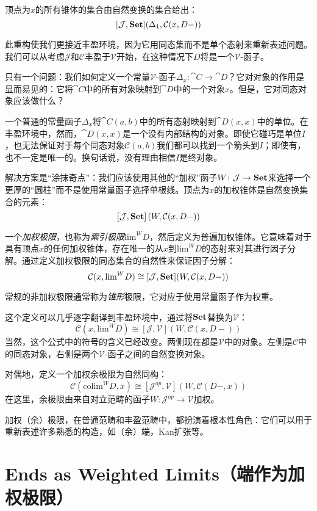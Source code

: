 \documentclass[DaoFP]{subfiles}
\begin{document}
 顶点为$x$的所有锥体的集合由自然变换的集合给出：
 \[ [\mathcal J, \mathbf{Set}] (\Delta_1, \mathcal C(x, D-)) \]

 此重构使我们更接近丰盈环境，因为它用同态集而不是单个态射来重新表述问题。我们可以从考虑$\mathcal J$和$\mathcal C$丰盈于$\mathcal V$开始，在这种情况下$D$将是一个$\mathcal V$-函子。

 只有一个问题：我们如何定义一个常量$\mathcal V$-函子$\Delta_x \colon \cat C \to \cat D$？它对对象的作用是显而易见的：它将$\cat C$中的所有对象映射到$\cat D$中的一个对象$x$。但是，它对同态对象应该做什么？

 一个普通的常量函子$\Delta_x$将$\cat C(a, b)$中的所有态射映射到$\cat D(x, x)$中的单位。在丰盈环境中，然而，$\cat D(x, x)$是一个没有内部结构的对象。即使它碰巧是单位$I$，也无法保证对于每个同态对象$\mathcal C(a, b)$我们都可以找到一个箭头到$I$；即使有，也不一定是唯一的。换句话说，没有理由相信$I$是终对象。

 解决方案是“涂抹奇点”：我们应该使用其他的“加权”函子$W \colon \mathcal J\to \mathbf{Set}$来选择一个更厚的“圆柱”而不是使用常量函子选择单根线。顶点为$x$的加权锥体是自然变换集合的元素：
 \[ [\mathcal J, \mathbf{Set}] \left(W, \mathcal C(x, D-)\right) \]

 一个\emph{加权极限}，也称为\emph{索引极限}$\text{lim}^W D$，然后定义为普遍加权锥体。它意味着对于具有顶点$x$的任何加权锥体，存在唯一的从$x$到$\text{lim}^W D$的态射来对其进行因子分解。通过定义加权极限的同态集合的自然性来保证因子分解：
 \[  \mathcal C(x, \text{lim}^W D) \cong [\mathcal J, \mathbf{Set}] (W, \mathcal C(x, D-)) \]

 常规的非加权极限通常称为\emph{锥形}极限，它对应于使用常量函子作为权重。

 这个定义可以几乎逐字翻译到丰盈环境中，通过将$\mathbf{Set}$替换为$\mathcal V$：
 \[  \mathcal C(x, \text{lim}^W D) \cong [\mathcal J, \mathcal V] (W, \mathcal C(x, D-)) \]
 当然，这个公式中的符号的含义已经改变。两侧现在都是$\mathcal V$中的对象。左侧是$\mathcal C$中的同态对象，右侧是两个$\mathcal V$-函子之间的自然变换对象。

 对偶地，定义一个加权余极限为自然同构：
 \[  \mathcal C(\text{colim}^W D, x) \cong [\mathcal J^{op}, \mathcal V] (W, \mathcal C(D-, x)) \]
 在这里，余极限由来自对立范畴的函子$W \colon \mathcal J^{op} \to \mathcal V$加权。

 加权（余）极限，在普通范畴和丰盈范畴中，都扮演着根本性角色：它们可以用于重新表述许多熟悉的构造，如（余）端，Kan扩张等。

 \section{Ends as Weighted Limits（端作为加权极限）}
\end{document}
